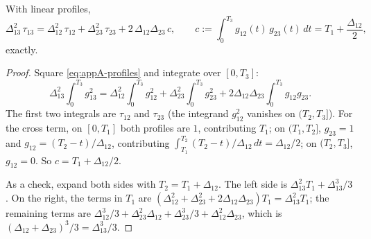 \documentclass[../../main.tex]{subfiles}
\begin{document}
\begin{proposition}\label{prop:appA-clocks}
With linear profiles,
\begin{equation}\label{eq:appA-clocks}
\Delta_{13}^2\,\tau_{13}=\Delta_{12}^2\,\tau_{12}+\Delta_{23}^2\,\tau_{23}+2\,\Delta_{12}\Delta_{23}\,c,\qquad c:=\int_0^{T_3}g_{12}(t)\,g_{23}(t)\,dt=T_1+\frac{\Delta_{12}}{2},
\end{equation}
exactly.
\end{proposition}

\begin{proof}
Square \eqref{eq:appA-profiles} and integrate over $[0,T_3]$:
\[
\Delta_{13}^2\int_0^{T_3}g_{13}^2=\Delta_{12}^2\int_0^{T_3}g_{12}^2+\Delta_{23}^2\int_0^{T_3}g_{23}^2+2\Delta_{12}\Delta_{23}\int_0^{T_3}g_{12}g_{23}.
\]
The first two integrals are $\tau_{12}$ and $\tau_{23}$ (the integrand $g_{12}^2$ vanishes on $(T_2,T_3]$). For the cross term, on $[0,T_1]$ both profiles are $1$, contributing $T_1$; on $(T_1,T_2]$, $g_{23}=1$ and $g_{12}=(T_2-t)/\Delta_{12}$, contributing $\int_{T_1}^{T_2}(T_2-t)/\Delta_{12}\,dt=\Delta_{12}/2$; on $(T_2,T_3]$, $g_{12}=0$. So $c=T_1+\Delta_{12}/2$.

As a check, expand both sides with $T_2=T_1+\Delta_{12}$. The left side is $\Delta_{13}^2T_1+\Delta_{13}^3/3$. On the right, the terms in $T_1$ are $(\Delta_{12}^2+\Delta_{23}^2+2\Delta_{12}\Delta_{23})T_1=\Delta_{13}^2T_1$; the remaining terms are $\Delta_{12}^3/3+\Delta_{23}^2\Delta_{12}+\Delta_{23}^3/3+\Delta_{12}^2\Delta_{23}$, which is $(\Delta_{12}+\Delta_{23})^3/3=\Delta_{13}^3/3$.
\end{proof}
\end{document}
